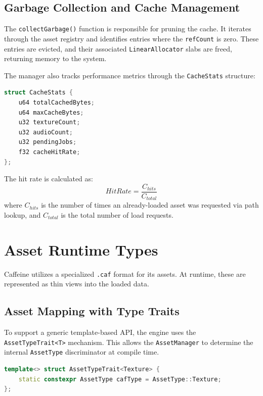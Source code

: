 \subsection{Garbage Collection and Cache Management}

The \texttt{collectGarbage()} function is responsible for pruning the cache. It iterates through the asset registry and identifies entries where the \texttt{refCount} is zero. These entries are evicted, and their associated \texttt{LinearAllocator} slabs are freed, returning memory to the system.

The manager also tracks performance metrics through the \texttt{CacheStats} structure:

\begin{lstlisting}[language=C++, caption={CacheStats definition}]
struct CacheStats {
    u64 totalCachedBytes;
    u64 maxCacheBytes;
    u32 textureCount;
    u32 audioCount;
    u32 pendingJobs;
    f32 cacheHitRate;
};
\end{lstlisting}

The hit rate is calculated as:
\begin{equation}
    HitRate = \frac{C_{hits}}{C_{total}}
\end{equation}
where $C_{hits}$ is the number of times an already-loaded asset was requested via path lookup, and $C_{total}$ is the total number of load requests.

\section{Asset Runtime Types}

Caffeine utilizes a specialized \texttt{.caf} format for its assets. At runtime, these are represented as thin views into the loaded data.

\subsection{Asset Mapping with Type Traits}

To support a generic template-based API, the engine uses the \texttt{AssetTypeTrait<T>} mechanism. This allows the \texttt{AssetManager} to determine the internal \texttt{AssetType} discriminator at compile time.

\begin{lstlisting}[language=C++, caption={AssetTypeTrait Specialization}]
template<> struct AssetTypeTrait<Texture> {
    static constexpr AssetType cafType = AssetType::Texture;
};
\end{lstlisting}

